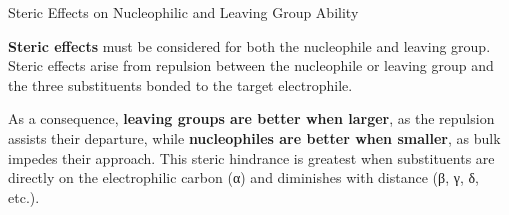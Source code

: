 \documentclass[10pt]{article}
\begin{document}
  \begin{core}{Steric Effects on Nucleophilic and Leaving Group Ability}
    
    \textbf{Steric effects} must be considered for both the nucleophile and leaving group. Steric effects arise from  repulsion between the nucleophile or leaving group and the three substituents bonded to the target electrophile.


    As a consequence, \textbf{leaving groups are better when larger}, as the repulsion assists their departure, while \textbf{nucleophiles are better when smaller}, as bulk impedes their approach. This steric hindrance is greatest when substituents are directly on the electrophilic carbon (α) and diminishes with distance (β, γ, δ, etc.).



\end{core}
\end{document}
